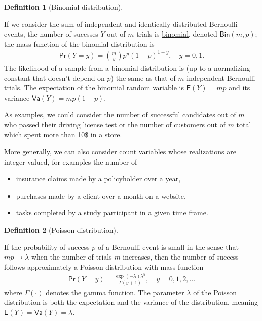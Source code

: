 \documentclass[
  11pt,
  letterpaper,
]{scrbook}
\providecommand{\tightlist}{%
  \setlength{\itemsep}{0pt}\setlength{\parskip}{0pt}}\usepackage{longtable,booktabs,array}
\theoremstyle{plain}
\theoremstyle{definition}
\theoremstyle{definition}
\newtheorem{definition}{Definition}[chapter]
\theoremstyle{remark}
\begin{document}
\begin{definition}[Binomial
distribution]\protect\hypertarget{def-binomialdist}{}\label{def-binomialdist}

If we consider the sum of independent and identically distributed
Bernoulli events, the number of sucesses \(Y\) out of \(m\) trials is
\href{https://en.wikipedia.org/wiki/Binomial_distribution}{binomial},
denoted \(\mathsf{Bin}(m, p)\); the mass function of the binomial
distribution is \begin{align*}
\mathsf{Pr}(Y=y) = \binom{m}{y}p^y (1-p)^{1-y}, \quad y=0, 1.
\end{align*} The likelihood of a sample from a binomial distribution is
(up to a normalizing constant that doesn't depend on \(p\)) the same as
that of \(m\) independent Bernoulli trials. The expectation of the
binomial random variable is \(\mathsf{E}(Y)=mp\) and its variance
\(\mathsf{Va}(Y)=mp(1-p).\)

\end{definition}

As examples, we could consider the number of successful candidates out
of \(m\) who passed their driving license test or the number of
customers out of \(m\) total which spent more than 10\$ in a store.

More generally, we can also consider count variables whose realizations
are integer-valued, for examples the number of

\begin{itemize}
\tightlist
\item
  insurance claims made by a policyholder over a year,
\item
  purchases made by a client over a month on a website,
\item
  tasks completed by a study participant in a given time frame.
\end{itemize}

\begin{definition}[Poisson
distribution]\protect\hypertarget{def-poissondist}{}\label{def-poissondist}

If the probability of success \(p\) of a Bernoulli event is small in the
sense that \(mp \to \lambda\) when the number of trials \(m\) increases,
then the number of success follows approximately a Poisson distribution
with mass function \begin{align*}
\mathsf{Pr}(Y=y) = \frac{\exp(-\lambda)\lambda^y}{\Gamma(y+1)}, \quad y=0, 1, 2, \ldots
\end{align*} where \(\Gamma(\cdot)\) denotes the gamma function. The
parameter \(\lambda\) of the Poisson distribution is both the
expectation and the variance of the distribution, meaning
\(\mathsf{E}(Y)=\mathsf{Va}(Y)=\lambda.\)

\end{definition}
\end{document}
